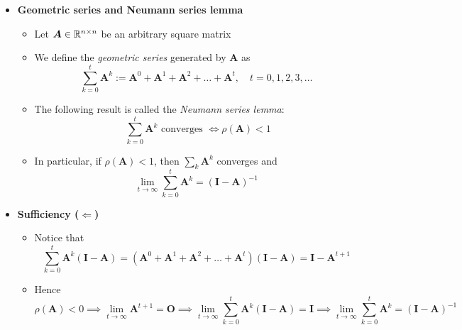 \documentclass[12pt,a4paper]{article}
\begin{document}
\begin{itemize}

\item \textbf{Geometric series and Neumann series lemma}
  \begin{itemize}
  \item Let $\bm{A}\in \mathbb{R}^{n\times n}$ be an arbitrary square matrix
  \item We define the \emph{geometric series} generated by $\bm{A}$ as
    \begin{equation}\nonumber%
      \sum_{k=0}^{t}\bm{A}^{k}
      := \bm{A}^{0} + \bm{A}^{1} + \bm{A}^{2} + \ldots + \bm{A}^{t},
      \quad
      t = 0, 1, 2, 3, \ldots
    \end{equation}
  \item The following result is called the \emph{Neumann series lemma}:
    \begin{equation}\nonumber%
      \text{
        $\sum_{k=0}^{t}\bm{A}^{k}$ converges
      }
      \iff
      \rho(\bm{A}) < 1
    \end{equation}
  \item In particular, if $\rho(\bm{A}) < 1$, then $\sum_{k}\bm{A}^{k}$ converges and
    \begin{equation}\nonumber%
      \lim_{t\to\infty}\sum_{k=0}^{t}\bm{A}^{k} = (\bm{I}-\bm{A})^{-1}
    \end{equation}
  \end{itemize}

\item \textbf{Sufficiency ($\Longleftarrow$)}
  \begin{itemize}
  \item Notice that
    \begin{equation}\nonumber%
      \sum_{k=0}^{t}\bm{A}^{k}\left(\bm{I}-\bm{A}\right)
      =
      \left(\bm{A}^{0} + \bm{A}^{1} + \bm{A}^{2} + \ldots + \bm{A}^{t}\right)\left(\bm{I}-\bm{A}\right)
      =
      \bm{I}-\bm{A}^{t+1}
    \end{equation}
  \item Hence
    \begin{equation}\nonumber%
      \rho(\bm{A}) < 0
      \implies
      \lim_{t\to\infty}\bm{A}^{t+1}=\bm{O}
      \implies
      \lim_{t\to\infty}\sum_{k=0}^{t}\bm{A}^{k}\left(\bm{I}-\bm{A}\right) = \bm{I}
      \implies
      \lim_{t\to\infty}\sum_{k=0}^{t}\bm{A}^{k} = \left(\bm{I}-\bm{A}\right)^{-1}
    \end{equation}
  \end{itemize}


\end{itemize}
\end{document}
